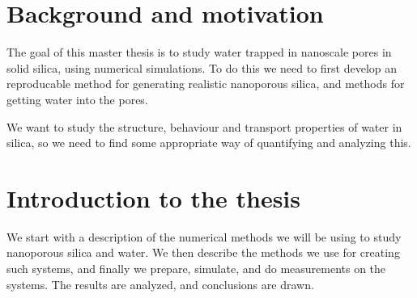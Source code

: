 \chapter{Background and motivation}
The goal of this master thesis is to study water trapped in nanoscale pores in solid silica, using numerical simulations. To do this we need to first develop an reproducable method for generating realistic nanoporous silica, and methods for getting water into the pores. 

We want to study the structure, behaviour and transport properties of water in silica, so we need to find some appropriate way of quantifying and analyzing this.


\chapter{Introduction to the thesis}
We start with a description of the numerical methods we will be using to study nanoporous silica and water. We then describe the methods we use for creating such systems, and finally we prepare, simulate, and do measurements on the systems. The results are analyzed, and conclusions are drawn.

% 




